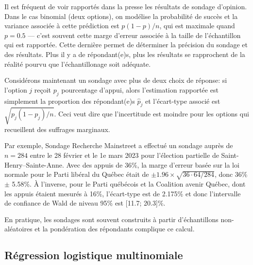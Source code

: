 \documentclass[
  11pt,
  letterpaper,
]{scrbook}
\theoremstyle{definition}
\theoremstyle{remark}
\begin{document}
Il est fréquent de voir rapportés dans la presse les résultats de
sondage d'opinion. Dans le cas binomial (deux options), on modélise la
probabilité de succès et la variance associée à cette prédiction est
\(p(1-p)/n\), qui est maximale quand \(p=0.5\) --- c'est souvent cette
marge d'erreur associée à la taille de l'échantillon qui est rapportée.
Cette dernière permet de déterminer la précision du sondage et des
résultats. Plus il y a de répondant(e)s, plus les résultats se
rapprochent de la réalité pourvu que l'échantillonage soit adéquate.

Considérons maintenant un sondage avec plus de deux choix de réponse: si
l'option \(j\) reçoit \(p_j\) pourcentage d'appui, alors l'estimation
rapportée est simplement la proportion des répondant(e)s
\(\widehat{p}_j\) et l'écart-type associé est \(\sqrt{p_j(1-p_j)/n}\).
Ceci veut dire que l'incertitude est moindre pour les options qui
recueillent des suffrages marginaux.

Par exemple, Sondage Recherche Mainstreet a effectué un sondage auprès
de \(n=284\) entre le 28 février et le 1e mars 2023 pour l'élection
partielle de Saint-Henry--Sainte-Anne. Avec des appuis de 36\%, la marge
d'erreur basée sur la loi normale pour le Parti libéral du Québec était
de \(\pm 1.96 \times \sqrt{36 \cdot 64/284}\), donc 36\% \(\pm\) 5.58\%.
À l'inverse, pour le Parti québécois et la Coalition avenir Québec, dont
les appuis étaient mesurés à 16\%, l'écart-type est de 2.175\% et donc
l'intervalle de confiance de Wald de niveau 95\% est {[}11.7; 20.3{]}\%.

En pratique, les sondages sont souvent construits à partir
d'échantillons non-aléatoires et la pondération des répondants complique
ce calcul.

\hypertarget{ruxe9gression-logistique-multinomiale}{%
\subsection{Régression logistique
multinomiale}\label{ruxe9gression-logistique-multinomiale}}
\end{document}
